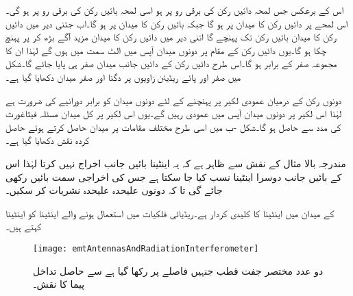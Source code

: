 اس کے برعکس جس لمحہ دائیں رکن کی برقی رو   پر ہو اسی لمحہ بائیں رکن کی برقی رو  پر ہو گی۔اس لمحے پر دائیں رکن کا میدان  پر ہو گا جبکہ بائیں رکن کا میدان  پر ہو گا۔اب جتنی دیر میں دائیں رکن کا میدان بائیں رکن تک پہنچے گا اتنی دیر میں دائیں رکن کا میدان مزید  آگے بڑھ کر  پر پہنچ چکا ہو گا۔یوں دائیں رکن کے مقام پر دونوں میدان آپس میں الٹ سمت میں ہوں گے لہٰذا ان کا مجموعہ صفر کے برابر ہو گا۔اس طرح دائیں رکن کے دائیں جانب میدان صفر ہی پایا جائے گا۔شکل  میں صفر اور پائے ریڈیئن زاویوں  پر دگنا اور صفر میدان دکھایا گیا ہے۔ 

دونوں رکن کے درمیان عمودی لکیر پر پہنچنے کے لئے دونوں میدان کو برابر دورانیے کی ضرورت ہے لہٰذا اس لکیر پر دونوں میدان آپس میں عمودی رہیں گے۔یوں اس لکیر پر کل میدان مسئلہ فیثاغورث کی مدد سے  حاصل ہو گا۔شکل -ب میں اسی طرح مختلف مقامات پر میدان حاصل کرتے ہوئے حاصل کردہ نقش دکھایا گیا ہے۔

مندرجہ بالا مثال کے نقش سے ظاہر ہے کہ یہ اینٹینا بائیں جانب اخراج نہیں کرتا لہٰذا اس کے بائیں جانب دوسرا اینٹینا نسب کیا جا سکتا ہے جس کی اخراجی سمت بائیں رکھی جائے گی تا کہ دونوں علیحدہ علیحدہ نشریات کر سکیں۔  

 کے میدان میں اینٹینا کا کلیدی کردار ہے۔ریڈیائی فلکیات میں استعمال ہونے والے اینٹینا کو  اینٹینا کہتے ہیں۔
\begin{figure}
\centering
\texttt{[image: emtAntennasAndRadiationInterferometer]}
\caption{دو عدد مختصر جفت قطب جنہیں  فاصلے پر رکھا گیا ہے سے حاصل تداخل پیما کا نقش۔}
\label{شکل_اینٹینا_تداخل_پیما}
\end{figure}

